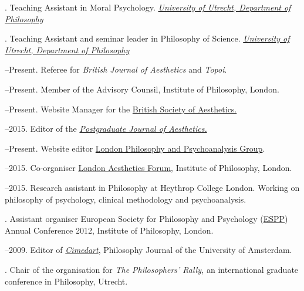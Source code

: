 \documentclass[12pt]{article}
\begin{document}
. Teaching Assistant in Moral Psychology. \href{http://www.uu.nl/faculty/humanities/EN/organisation/departments/departmentofphilosophy/Pages/default.aspx}{\emph{University of Utrecht, Department of  Philosophy}} \vspace{0.01in}

. Teaching Assistant and seminar leader in Philosophy of Science. \href{http://www.uu.nl/faculty/humanities/EN/organisation/departments/departmentofphilosophy/Pages/default.aspx}{\emph{University of Utrecht, Department of  Philosophy}} \vspace{0.01in}

\bigskip

\medskip

--Present. Referee for \emph{British Journal of Aesthetics} and \emph{Topoi}.

--Present. Member of the Advisory Counsil, Institute of Philosophy, London.

--Present. Website Manager for the \href{http://www.british-aesthetics.org.uk}{British Society of Aesthetics.}

--2015. Editor of the \href{http:\\www.pjaesthetics.org}{\emph{Postgraduate Journal of Aesthetics.}}

--Present. Website editor \href{http://www.philosophy-psychoanalysis.org.uk}{London Philosophy and Psychoanalysis Group}.

--2015. Co-organiser \href{http:\\www.londonaestheticsforum.org}{London Aesthetics Forum}, Institute of Philosophy, London.

--2015. Research assistant in Philosophy at Heythrop College London. Working on philosophy of psychology, clinical methodology and psychoanalysis.

. Assistant organiser European Society for Philosophy and Psychology (\href{http://www.eurospp.org}{ESPP}) Annual Conference 2012, Institute of Philosophy, London. 

--2009. Editor of \href{http://www.cimedart.nl}{\emph{Cimedart}}, Philosophy Journal of the University of Amsterdam.

. Chair of the organisation for \emph{The Philosophers' Rally,} an international graduate conference in Philosophy, Utrecht.
\end{document}
